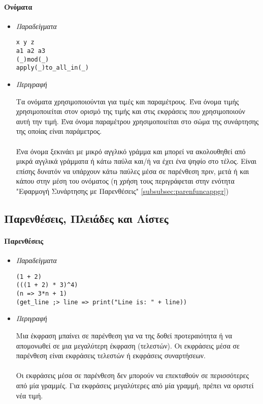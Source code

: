 \documentclass[diploma]{softlab-thesis}
\begin{document}
\paragraph{Ονόματα}
\begin{itemize}

\item \textit{Παραδείγματα}
\begin{verbatim}
x y z
a1 a2 a3
(_)mod(_)
apply(_)to_all_in(_)
\end{verbatim}

\item \textit{Περιγραφή}

Τα ονόματα χρησιμοποιούνται για τιμές και παραμέτρους. Ένα όνομα τιμής
χρησιμοποιείται στον ορισμό της τιμής και στις εκφράσεις που χρησιμοποιούν
αυτή την τιμή. Ένα όνομα παραμέτρου χρησιμοποιείται στο σώμα της συνάρτησης
της οποίας είναι παράμετρος.
\\\\
Ένα όνομα ξεκινάει με μικρό αγγλικό γράμμα και μπορεί να ακολουθηθεί
από μικρά αγγλικά γράμματα ή κάτω παύλα και/ή να έχει ένα ψηφίο στο τέλος.
Είναι επίσης δυνατόν να υπάρχουν κάτω παύλες μέσα σε παρένθεση πριν, μετά ή
και κάπου στην μέση του ονόματος (η χρήση τους περιγράφεται στην ενότητα
"Εφαρμογή Συνάρτησης με Παρενθέσεις" \ref{subsubsec:parenfuncappgr})

\end{itemize}

\newpage
\subsection{Παρενθέσεις, Πλειάδες και Λίστες}

\paragraph{Παρενθέσεις}

\begin{itemize}

\item \textit{Παραδείγματα}
\begin{verbatim}
(1 + 2)
(((1 + 2) * 3)^4)
(n => 3*n + 1)
(get_line ;> line => print("Line is: " + line))
\end{verbatim}

\item \textit{Περιγραφή}

Μια έκφραση μπαίνει σε παρένθεση για να της δοθεί προτεραιότητα ή να απομονωθεί
σε μια μεγαλύτερη έκφραση (τελεστών).  Οι εκφράσεις μέσα σε παρένθεση είναι
εκφράσεις τελεστών ή εκφράσεις συναρτήσεων.
\\\\
Οι εκφράσεις μέσα σε παρένθεση δεν μπορούν να επεκταθούν σε περισσότερες από
μία γραμμές. Για εκφράσεις μεγαλύτερες από μία γραμμή, πρέπει να οριστεί νέα
τιμή.

\end{itemize}
\end{document}
